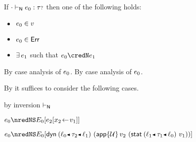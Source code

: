 \begin{lemma}\label{H-type-progress}
  If\/ ${\cdot} \vdash_{\mathsf{N}} e_0 : {\tau{\scriptstyle ?}}$
  then one of the following holds:
  \begin{itemize}
    \item
      $e_0 \in v$
    \item
      $e_0 \in \mathsf{Err}$
    \item
      $\exists\,e_1$
      such that\/ $\sexpr_0 \credN \sexpr_1$
  \end{itemize}
\end{lemma}{
  \newcommand{\shortpf}{By case analysis of $\sexpr_0$.}
\begin{lamportproof*}
  \shortpf
\mainproof
  \shortpf

  By  it suffices to consider the following cases.

    \begin{pfproof}
      \qedstep
    \end{pfproof}

    \begin{pfproof}
      \qedstep
    \end{pfproof}

    \begin{pfproof}
        \begin{pfproof}
          by inversion $\vdash_{\mathsf{N}}$
        \end{pfproof}
        \begin{pfproof}
          \qedstep
            \begin{pfproof}
              $\sexpr_0 \nredNS \ctx_0[\esubst{\sexpr_2}{\svar_2}{\svalue_1}]$
            \end{pfproof}
        \end{pfproof}
        \begin{pfproof}
          \qedstep
            \begin{pfproof}
              $\sexpr_0 \nredNS \ctx_0[\edynb{\obnd{\sowner_0}{\stype_2}{\sowner_1}}{(\eapp{\tdyn}{\svalue_2}{(\estab{\obnd{\sowner_1}{\stype_1}{\sowner_0}}{\svalue_1})})}]$
            \end{pfproof}
        \end{pfproof}
    \end{pfproof}


\end{lamportproof*}}
